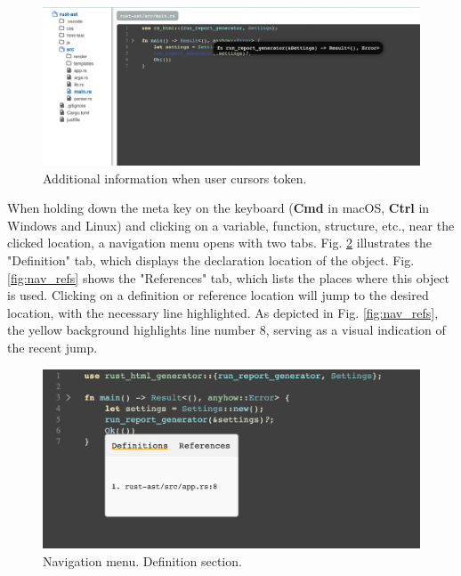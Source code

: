 \begin{figure}[ht]
\centering
\includegraphics[width=15cm]{figs/screenshots/hover.png}
\caption{Additional information when user cursors token.}
\label{fig:hover}
\end{figure}

When holding down the meta key on the keyboard (\textbf{Cmd} in macOS, \textbf{Ctrl} in Windows and Linux) and clicking on a variable, function, structure, etc., near the clicked location, a navigation menu opens with two tabs. Fig. \ref{fig:nav_def} illustrates the "Definition" tab, which displays the declaration location of the object. Fig. \ref{fig:nav_refs} shows the "References" tab, which lists the places where this object is used. Clicking on a definition or reference location will jump to the desired location, with the necessary line highlighted. As depicted in Fig. \ref{fig:nav_refs}, the yellow background highlights line number 8, serving as a visual indication of the recent jump.

\begin{figure}[ht]
\centering
\includegraphics[width=15cm]{figs/screenshots/nav_def_2.png}
\caption{Navigation menu. Definition section.}
\label{fig:nav_def}
\end{figure}


